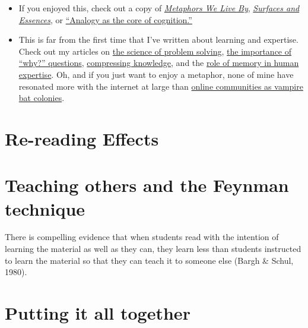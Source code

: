 \begin{itemize}
\itemsep1pt\parskip0pt
\item
  If you enjoyed this, check out a copy of
  \href{http://www.amazon.com/gp/product/0226468011/ref=as_li_tl?ie=UTF8\&camp=1789\&creative=390957\&creativeASIN=0226468011\&linkCode=as2\&tag=rsio-20}{\emph{Metaphors
  We Live By}},
  \href{http://www.amazon.com/gp/product/B00BE65086/ref=as_li_tl?ie=UTF8\&camp=1789\&creative=390957\&creativeASIN=B00BE65086\&linkCode=as2\&tag=rsio-20}{\emph{Surfaces
  and Essences}}, or
  \href{http://worrydream.com/refs/Hofstadter\%20-\%20Analogy\%20as\%20the\%20Core\%20of\%20Cognition.pdf}{``Analogy
  as the core of cognition.''}
\item
  This is far from the first time that I've written about learning and
  expertise. Check out my articles on
  \href{http://rs.io/2014/02/21/problem-solving.html}{the science of
  problem solving},
  \href{http://rs.io/2014/02/25/why-questions-reveal-structure.html}{the
  importance of ``why?'' questions},
  \href{http://rs.io/2014/02/24/compressing-knowledge.html}{compressing
  knowledge}, and the
  \href{http://rs.io/2014/01/20/human-expertise-and-memory-machines.html}{role
  of memory in human expertise}. Oh, and if you just want to enjoy a
  metaphor, none of mine have resonated more with the internet at large
  than
  \href{http://rs.io/2014/02/26/why-online-communities-decay-over-time.html}{online
  communities as vampire bat colonies}.
\end{itemize}


\section{Re-reading Effects}
\section{Teaching others and the Feynman technique}
There is compelling evidence that when students read with the intention of learning the material as well as they can, they learn less than students instructed to learn the material so that they can teach it to someone else (Bargh & Schul, 1980).

\section{Putting it all together}
